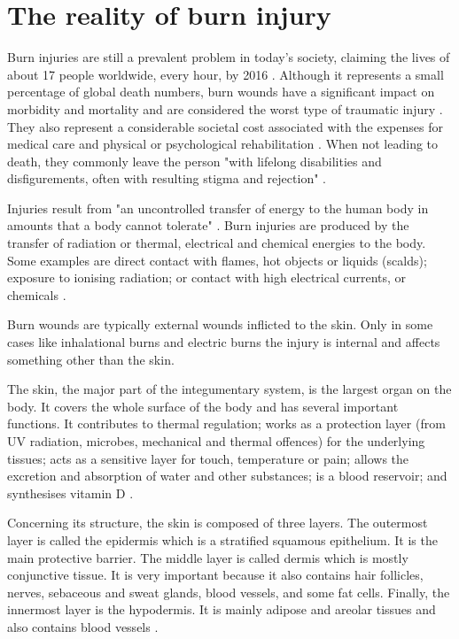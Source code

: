\section{The reality of burn injury} %
\label{sec:the_reality_of_burn_injury}

Burn injuries are still a prevalent problem in today's society, claiming the lives of about 17 people worldwide, every hour, by 2016 \cite{GHE2016_xls}. Although it represents a small percentage of global death numbers, burn wounds have a significant impact on morbidity and mortality and are considered the worst type of traumatic injury \cite{isbi_guidelines_burn_care}. They also represent a considerable societal cost associated with the expenses for medical care and physical or psychological rehabilitation \cite{Brusselaers_2010_europe_systematic_review}. When not leading to death, they commonly leave the person "with lifelong disabilities and disfigurements, often with resulting stigma and rejection" \cite{who2011_sucess_stories}.

Injuries result from "an uncontrolled transfer of energy to the human body in amounts that a body cannot tolerate" \cite{who2011_sucess_stories}. Burn injuries are produced by the transfer of radiation or thermal, electrical and chemical energies to the body. Some examples are direct contact with flames, hot objects or liquids (scalds); exposure to ionising radiation; or contact with high electrical currents, or chemicals \cite{who_unicef2008_burns_chapter}.

Burn wounds are typically external wounds inflicted to the skin. Only in some cases like inhalational burns and electric burns the injury is internal and affects something other than the skin.

The skin, the major part of the integumentary system, is the largest organ on the body. It covers the whole surface of the body and has several important functions. It contributes to thermal regulation; works as a protection layer (from UV radiation, microbes, mechanical and thermal offences) for the underlying tissues; acts as a sensitive layer for touch, temperature or pain; allows the excretion and absorption of water and other substances; is a blood reservoir; and synthesises vitamin D \cite{Tortora2009_principles_anatomy_physiology}. 

Concerning its structure, the skin is composed of three layers. The outermost layer is called the epidermis which is a stratified squamous epithelium. It is the main protective barrier. The middle layer is called dermis which is mostly conjunctive tissue.  It is very important because it also contains hair follicles, nerves, sebaceous and sweat glands, blood vessels, and some fat cells. Finally, the innermost layer is the hypodermis. It is mainly adipose and areolar tissues and also contains blood vessels \cite{Tortora2009_principles_anatomy_physiology}.

